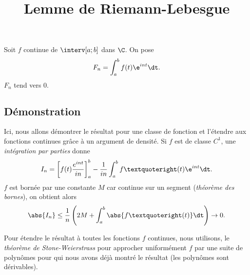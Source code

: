 \documentclass[fontsize=12pt,twoside=false,parskip=half, french]{scrartcl}
\title{Lemme de Riemann-Lebesgue}
\date{}
\author{}
\begin{document}
\maketitle
   \begin{Theoreme}
      Soit $f$ continue de $\interv[a; b]$ dans $\C$. On pose
      \[
         F_n = \int_a^b f(t)\e^{int} \dt.
      \]
      $F_n$ tend vers 0.
   \end{Theoreme}
   \subsection{Démonstration}
      Ici, nous allons démontrer le résultat pour une classe de fonction et l’étendre aux fonctions continues 
      grâce à un argument de densité. Si $f$ est de classe $C^1$, une \emph{intégration par parties} donne
      \[
         I_n = \left[f(t) \frac{e^{int}}{in}\right]_a^b - \frac{1}{in} \int_a^b f’(t)\e^{int} \dt.
      \]
      $f$ est bornée par une constante $M$ car continue sur un segment (\emph{théorème des bornes}), on obtient alors
      \[
         \abs{I_n} \leq \frac{1}{n} \left(2M + \int_a^b \abs{f’(t)} \dt\right) \to 0.
      \]
      
      Pour étendre le résultat à toutes les fonctions $f$ continues, nous utilisons, le
      \emph{théorème de Stone-Weierstrass} pour approcher uniformément $f$ par une suite de polynômes pour qui nous
      avons déjà montré le résultat (les polynômes sont dérivables).
\end{document}
